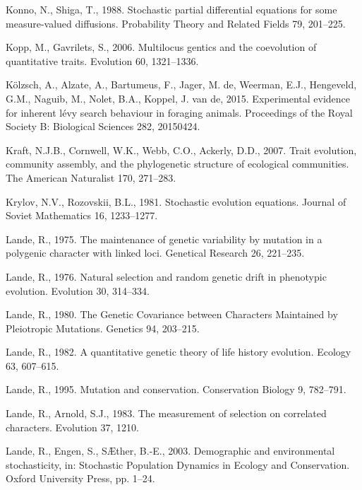 \documentclass[]{elsarticle} %
\begin{document}
\leavevmode\hypertarget{ref-Konno1988}{}%
Konno, N., Shiga, T., 1988. Stochastic partial differential equations
for some measure-valued diffusions. Probability Theory and Related
Fields 79, 201--225.

\leavevmode\hypertarget{ref-Kopp2006}{}%
Kopp, M., Gavrilets, S., 2006. Multilocus gentics and the coevolution of
quantitative traits. Evolution 60, 1321--1336.

\leavevmode\hypertarget{ref-Klzsch2015}{}%
Kölzsch, A., Alzate, A., Bartumeus, F., Jager, M. de, Weerman, E.J.,
Hengeveld, G.M., Naguib, M., Nolet, B.A., Koppel, J. van de, 2015.
Experimental evidence for inherent lévy search behaviour in foraging
animals. Proceedings of the Royal Society B: Biological Sciences 282,
20150424.

\leavevmode\hypertarget{ref-Kraft2007}{}%
Kraft, N.J.B., Cornwell, W.K., Webb, C.O., Ackerly, D.D., 2007. Trait
evolution, community assembly, and the phylogenetic structure of
ecological communities. The American Naturalist 170, 271--283.

\leavevmode\hypertarget{ref-Krylov1981}{}%
Krylov, N.V., Rozovskii, B.L., 1981. Stochastic evolution equations.
Journal of Soviet Mathematics 16, 1233--1277.

\leavevmode\hypertarget{ref-Lande1975}{}%
Lande, R., 1975. The maintenance of genetic variability by mutation in a
polygenic character with linked loci. Genetical Research 26, 221--235.

\leavevmode\hypertarget{ref-Lande1976}{}%
Lande, R., 1976. Natural selection and random genetic drift in
phenotypic evolution. Evolution 30, 314--334.

\leavevmode\hypertarget{ref-pmid17248993}{}%
Lande, R., 1980. The Genetic Covariance between Characters Maintained by
Pleiotropic Mutations. Genetics 94, 203--215.

\leavevmode\hypertarget{ref-Lande1982}{}%
Lande, R., 1982. A quantitative genetic theory of life history
evolution. Ecology 63, 607--615.

\leavevmode\hypertarget{ref-Lande1995}{}%
Lande, R., 1995. Mutation and conservation. Conservation Biology 9,
782--791.

\leavevmode\hypertarget{ref-Lande1983}{}%
Lande, R., Arnold, S.J., 1983. The measurement of selection on
correlated characters. Evolution 37, 1210.

\leavevmode\hypertarget{ref-Lande2003}{}%
Lande, R., Engen, S., SÆther, B.-E., 2003. Demographic and environmental
stochasticity, in: Stochastic Population Dynamics in Ecology and
Conservation. Oxford University Press, pp. 1--24.
\end{document}
